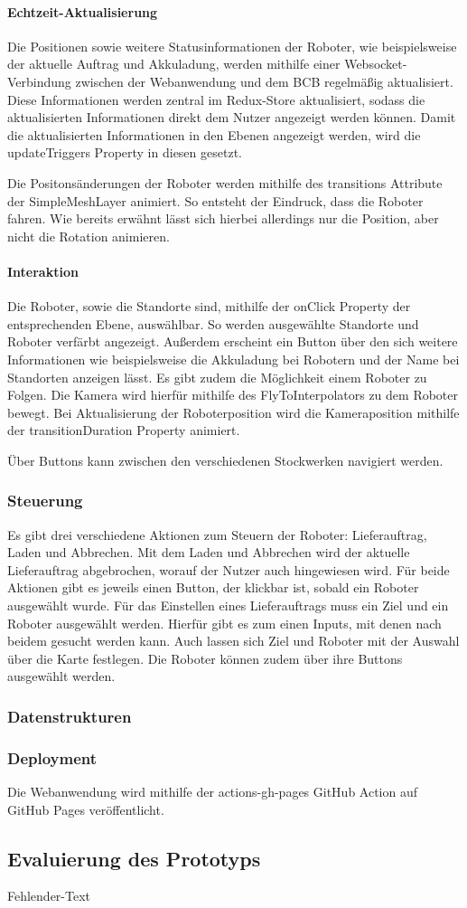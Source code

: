 \paragraph{Echtzeit-Aktualisierung}
Die Positionen sowie weitere Statusinformationen der Roboter, wie beispielsweise der aktuelle Auftrag und Akkuladung, werden mithilfe einer \gls{Websocket}-Verbindung zwischen der Webanwendung und dem \ac{BCB} regelmäßig aktualisiert. Diese Informationen werden zentral im Redux-Store aktualisiert, sodass die aktualisierten Informationen direkt dem Nutzer angezeigt werden können. Damit die aktualisierten Informationen in den Ebenen angezeigt werden, wird die updateTriggers Property in diesen gesetzt.

Die Positonsänderungen der Roboter werden mithilfe des transitions Attribute der SimpleMeshLayer animiert. So entsteht der Eindruck, dass die Roboter fahren. Wie bereits erwähnt lässt sich hierbei allerdings nur die Position, aber nicht die Rotation animieren.

\paragraph{Interaktion}
Die Roboter, sowie die Standorte sind, mithilfe der onClick Property der entsprechenden Ebene, auswählbar. So werden ausgewählte Standorte und Roboter verfärbt angezeigt. Außerdem erscheint ein Button über den sich weitere Informationen wie beispielsweise die Akkuladung bei Robotern und der Name bei Standorten anzeigen lässt. Es gibt zudem die Möglichkeit einem Roboter zu Folgen. Die Kamera wird hierfür mithilfe des FlyToInterpolators zu dem Roboter bewegt. Bei Aktualisierung der Roboterposition wird die Kameraposition mithilfe der transitionDuration Property animiert.

Über Buttons kann zwischen den verschiedenen Stockwerken navigiert werden. 

\subsubsection{Steuerung}
Es gibt drei verschiedene Aktionen zum Steuern der Roboter: Lieferauftrag, Laden und Abbrechen. Mit dem Laden und Abbrechen wird der aktuelle Lieferauftrag abgebrochen, worauf der Nutzer auch hingewiesen wird. Für beide Aktionen gibt es jeweils einen Button, der klickbar ist, sobald ein Roboter ausgewählt wurde. Für das Einstellen eines Lieferauftrags muss ein Ziel und ein Roboter ausgewählt werden. Hierfür gibt es zum einen Inputs, mit denen nach beidem gesucht werden kann. Auch lassen sich Ziel und Roboter mit der Auswahl über die Karte festlegen. Die Roboter können zudem über ihre Buttons ausgewählt werden.

\subsubsection{Datenstrukturen}

\subsubsection{Deployment}

Die Webanwendung wird mithilfe der actions-gh-pages GitHub Action auf GitHub Pages veröffentlicht.

\newpage
\subsection{Evaluierung des Prototyps}
Fehlender-Text